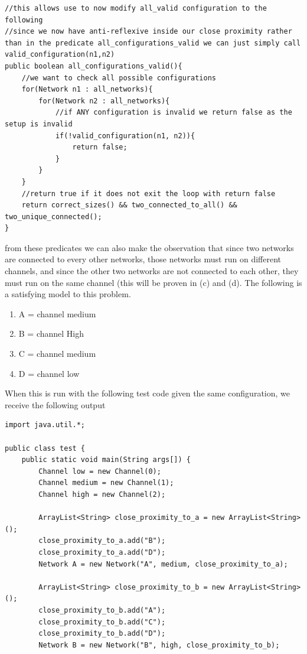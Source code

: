 \documentclass{article}
\begin{document}
\begin{enumerate}[(a)]
    \begin{lstlisting}
//this allows use to now modify all_valid configuration to the following
//since we now have anti-reflexive inside our close proximity rather than in the predicate all_configurations_valid we can just simply call valid_configuration(n1,n2)
public boolean all_configurations_valid(){
    //we want to check all possible configurations
    for(Network n1 : all_networks){
        for(Network n2 : all_networks){
            //if ANY configuration is invalid we return false as the setup is invalid
            if(!valid_configuration(n1, n2)){
                return false;
            }
        }
    }
    //return true if it does not exit the loop with return false
    return correct_sizes() && two_connected_to_all() && two_unique_connected();
}
        \end{lstlisting}
        from these predicates we can also make the observation that since two networks are connected to every other networks, those networks must run on different channels, and since the other two networks are not connected to each other, they must run on the same channel (this will be proven in (c) and (d). The following is a satisfying model to this problem. 
        \begin{enumerate}
            \item A = channel medium
            \item B = channel High
            \item C = channel medium
            \item D = channel low
        \end{enumerate}
        \newpage
        When this is run with the following test code given the same configuration, we receive the following output
        \begin{lstlisting}
import java.util.*;

public class test {
    public static void main(String args[]) {
        Channel low = new Channel(0);
        Channel medium = new Channel(1);
        Channel high = new Channel(2);

        ArrayList<String> close_proximity_to_a = new ArrayList<String>();
        close_proximity_to_a.add("B");
        close_proximity_to_a.add("D");
        Network A = new Network("A", medium, close_proximity_to_a);

        ArrayList<String> close_proximity_to_b = new ArrayList<String>();
        close_proximity_to_b.add("A");
        close_proximity_to_b.add("C");
        close_proximity_to_b.add("D");
        Network B = new Network("B", high, close_proximity_to_b);


\end{lstlisting}
\end{enumerate}
\end{document}
